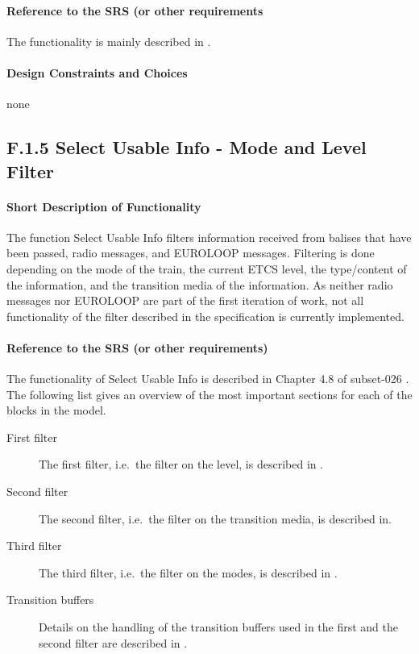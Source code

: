 \documentclass{template/openetcs_report}
\begin{document}
\paragraph{Reference to the SRS (or other requirements}
The functionality is mainly described in \cite[Chapter~3.6.3]{subset-026}.

\paragraph{Design Constraints and Choices}
none

\subsection{F.1.5 Select Usable Info - Mode and Level Filter}

\paragraph{Short Description of Functionality}
The function Select Usable Info filters information received from balises that have been passed, radio messages, and EUROLOOP messages. Filtering is done depending on the mode of the train, the current ETCS level, the type/content of the information, and the transition media of the information. As neither radio messages nor EUROLOOP are part of the first iteration of work, not all functionality of the filter described in the specification is currently implemented.

\paragraph{Reference to the SRS (or other requirements)}
The functionality of Select Usable Info is described in Chapter 4.8 of subset-026 \cite{subset-026}. The following list gives an overview of the most important sections for each of the blocks in the model.

\begin{description}
\item[First filter] The first filter, i.e.~the filter on the level, is described in \cite[Chapter~4.8.3]{subset-026}.
\item[Second filter] The second filter, i.e.~the filter on the transition media, is described in\cite[Chapter~4.8.3]{subset-026}.
\item[Third filter]
 The third filter, i.e.~the filter on the modes, is described in \cite[Chapter~4.8.4]{subset-026}.
\item[Transition buffers] Details on the handling of the transition buffers used in the first and the second filter are described in \cite[Chapter~4.8.5]{subset-026}.
\end{description}
\end{document}
